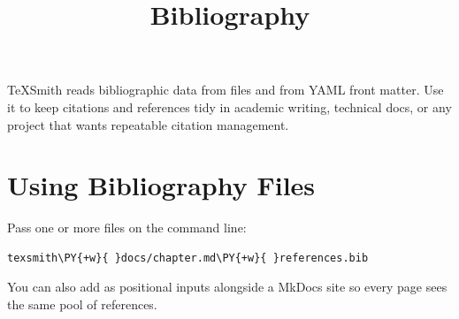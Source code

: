 \documentclass[a4paper,twoside]{article}
\title{Bibliography}
\author{}\date{}
\begin{document}
\maketitle
TeXSmith reads bibliographic data from  files and from YAML front matter. Use it to keep citations and references tidy in academic writing, technical docs, or any project that wants repeatable citation management.
\section{Using Bibliography Files}
Pass one or more  files on the command line:
\begin{tscode}[lang=bash, engine=pygments]
\begin{Verbatim}[commandchars=\\\{\},breaklines, breakanywhere, commandchars=\\\{\}]
texsmith\PY{+w}{ }docs/chapter.md\PY{+w}{ }references.bib
\end{Verbatim}
\end{tscode}
You can also add  as positional inputs alongside a MkDocs site so every page sees the same pool of references.
\end{document}

